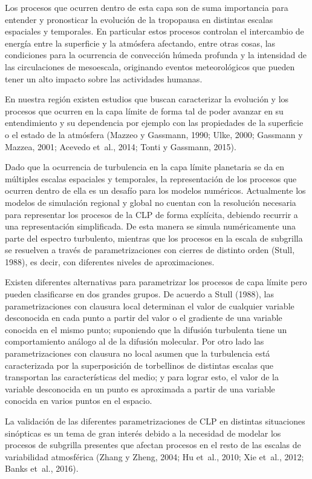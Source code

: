 \documentclass[12pt,spanish,oneside]{book}
\begin{document}
Los procesos que ocurren dentro de esta capa son de suma importancia
para entender y pronosticar la evolución de la tropopausa en distintas
escalas espaciales y temporales. En particular estos procesos controlan
el intercambio de energía entre la superficie y la atmósfera afectando,
entre otras cosas, las condiciones para la ocurrencia de convección
húmeda profunda y la intensidad de las circulaciones de mesoescala,
originando eventos meteorológicos que pueden tener un alto impacto sobre
las actividades humanas.

En nuestra región existen estudios que buscan caracterizar la evolución
y los procesos que ocurren en la capa límite de forma tal de poder
avanzar en su entendimiento y su dependencia por ejemplo con las
propiedades de la superficie o el estado de la atmósfera (Mazzeo y
Gassmann, 1990; Ulke, 2000; Gassmann y Mazzea, 2001; Acevedo et~al.,
2014; Tonti y Gassmann, 2015).

Dado que la ocurrencia de turbulencia en la capa límite planetaria se da
en múltiples escalas espaciales y temporales, la representación de los
procesos que ocurren dentro de ella es un desafío para los modelos
numéricos. Actualmente los modelos de simulación regional y global no
cuentan con la resolución necesaria para representar los procesos de la
CLP de forma explícita, debiendo recurrir a una representación
simplificada. De esta manera se simula numéricamente una parte del
espectro turbulento, mientras que los procesos en la escala de subgrilla
se resuelven a través de parametrizaciones con cierres de distinto orden
(Stull, 1988), es decir, con diferentes niveles de aproximaciones.

Existen diferentes alternativas para parametrizar los procesos de capa
límite pero pueden clasificarse en dos grandes grupos. De acuerdo a
Stull (1988), las parametrizaciones con clausura local determinan el
valor de cualquier variable desconocida en cada punto a partir del valor
o el gradiente de una variable conocida en el mismo punto; suponiendo
que la difusión turbulenta tiene un comportamiento análogo al de la
difusión molecular. Por otro lado las parametrizaciones con clausura no
local asumen que la turbulencia está caracterizada por la superposición
de torbellinos de distintas escalas que transportan las características
del medio; y para lograr esto, el valor de la variable desconocida en un
punto es aproximada a partir de una variable conocida en varios puntos
en el espacio.

La validación de las diferentes parametrizaciones de CLP en distintas
situaciones sinópticas es un tema de gran interés debido a la necesidad
de modelar los procesos de subgrilla presentes que afectan procesos en
el resto de las escalas de variabilidad atmosférica (Zhang y Zheng,
2004; Hu et~al., 2010; Xie et~al., 2012; Banks et~al., 2016).
\end{document}
